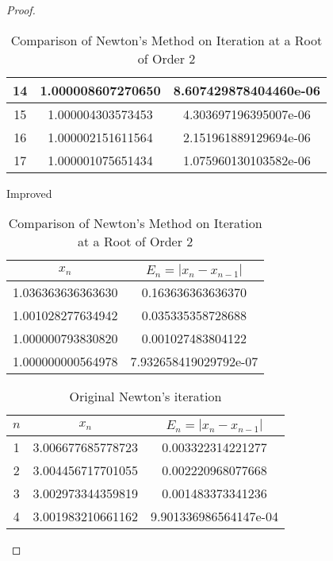 \begin{enumerate}
\begin{proof}
\begin{table}[htbp]
\begin{subtable}[t]{.49\linewidth}
\begin{tabular}[t]{|c|c|c|}
			\footnotesize	14	&	\footnotesize	1.000008607270650	&	\footnotesize	8.607429878404460e-06	\\	\hline
			\footnotesize	15	&	\footnotesize	1.000004303573453	&	\footnotesize	4.303697196395007e-06	\\	\hline
			\footnotesize	16	&	\footnotesize	1.000002151611564	&	\footnotesize	2.151961889129694e-06	\\	\hline
			\footnotesize	17	&	\footnotesize	1.000001075651434	&	\footnotesize	1.075960130103582e-06	\\	\hline
			\end{tabular}
		\end{subtable}
		\begin{subtable}[t]{.49\linewidth}
			\centering
			\caption{Improved}
			\begin{tabular}{|c|c|}
				\hline
				\(x_n\)				&	\(E_n=|x_n-x_{n-1}|\)	\\	\hline
				\footnotesize	1.036363636363630	&	\footnotesize	0.163636363636370	\\	\hline
				\footnotesize	1.001028277634942	&	\footnotesize	0.035335358728688	\\	\hline
				\footnotesize	1.000000793830820	&	\footnotesize	0.001027483804122	\\	\hline
				\footnotesize	1.000000000564978	&	\footnotesize	7.932658419029792e-07	\\	\hline
			\end{tabular}
		\end{subtable}
		\caption{Comparison of Newton's Method on Iteration at a Root of Order 2}
		\label{newtoncompare2}
	\end{table}
	\begin{table}[htbp]
		\begin{subtable}[t]{.49\linewidth}
			\centering
			\caption{Original Newton's iteration}
			\begin{tabular}{|c|c|c|}
			\hline
			$n$	&	\(x_n\)				&	\(E_n=|x_n-x_{n-1}|\)	\\	\hline
			\footnotesize	1	&	\footnotesize	3.006677685778723	&	\footnotesize	0.003322314221277	\\	\hline
			\footnotesize	2	&	\footnotesize	3.004456717701055	&	\footnotesize	0.002220968077668	\\	\hline
			\footnotesize	3	&	\footnotesize	3.002973344359819	&	\footnotesize	0.001483373341236	\\	\hline
			\footnotesize	4	&	\footnotesize	3.001983210661162	&	\footnotesize	9.901336986564147e-04	\\	\hline

\end{tabular}
\end{subtable}
\end{table}
\end{proof}
\end{enumerate}

